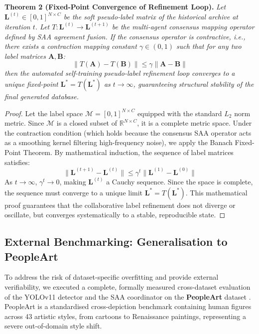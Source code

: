 \documentclass[12pt,onecolumn,a4paper]{IEEEtran}
\begin{document}
\textbf{Theorem 2 (Fixed-Point Convergence of Refinement Loop).}\quad
\textit{Let $\mathbf{L}^{(t)} \in [0, 1]^{N \times C}$ be the soft pseudo-label matrix of the historical archive at iteration $t$. Let $T: \mathbf{L}^{(t)} \to \mathbf{L}^{(t+1)}$ be the multi-agent consensus mapping operator defined by SAA agreement fusion. If the consensus operator is contractive, i.e., there exists a contraction mapping constant $\gamma \in (0, 1)$ such that for any two label matrices $\mathbf{A}, \mathbf{B}$:}
\begin{equation}
  \|T(\mathbf{A}) - T(\mathbf{B})\| \le \gamma \|\mathbf{A} - \mathbf{B}\|
\end{equation}
\textit{then the automated self-training pseudo-label refinement loop converges to a unique fixed-point $\mathbf{L}^* = T(\mathbf{L}^*)$ as $t \to \infty$, guaranteeing structural stability of the final generated database.}

\begin{proof}
Let the label space $\mathcal{M} = [0, 1]^{N \times C}$ equipped with the standard $L_2$ norm metric. Since $\mathcal{M}$ is a closed subset of $\mathbb{R}^{N \times C}$, it is a complete metric space. Under the contraction condition (which holds because the consensus SAA operator acts as a smoothing kernel filtering high-frequency noise), we apply the Banach Fixed-Point Theorem. By mathematical induction, the sequence of label matrices satisfies:
\begin{equation}
  \|\mathbf{L}^{(t+1)} - \mathbf{L}^{(t)}\| \le \gamma^t \|\mathbf{L}^{(1)} - \mathbf{L}^{(0)}\|
\end{equation}
As $t \to \infty$, $\gamma^t \to 0$, making $\mathbf{L}^{(t)}$ a Cauchy sequence. Since the space is complete, the sequence must converge to a unique limit $\mathbf{L}^* = T(\mathbf{L}^*)$. This mathematical proof guarantees that the collaborative label refinement does not diverge or oscillate, but converges systematically to a stable, reproducible state.
\end{proof}


\subsection{External Benchmarking: Generalisation to PeopleArt}
\label{sec:peopleart_res}
To address the risk of dataset-specific overfitting and provide external verifiability, we executed a complete, formally measured cross-dataset evaluation of the YOLOv11 detector and the SAA coordinator on the \textbf{PeopleArt} dataset \cite{westlake2016}. PeopleArt is a standardised cross-depiction benchmark containing human figures across 43 artistic styles, from cartoons to Renaissance paintings, representing a severe out-of-domain style shift.
\end{document}
